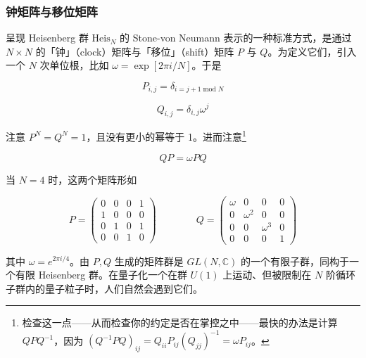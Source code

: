 \subsubsection*{钟矩阵与移位矩阵} %

呈现 Heisenberg 群 $\mathrm{Heis}_N$ 的 Stone-von Neumann 表示的一种标准方式，是通过 $N\times N$ 的「钟」（clock）矩阵与「移位」（shift）矩阵 $P$ 与 $Q$。为定义它们，引入一个 $N$ 次单位根，比如 $\omega=\exp[2\pi i/N]$。于是

\begin{equation}
  P_{i,j}=\delta_{i=j+1\operatorname{mod}N}
  \tag{2.207}
  \label{eq:2.207}
\end{equation}

\begin{equation}
  Q_{i,j}=\delta_{i,j}\omega^{j}
  \tag{2.208}
  \label{eq:2.208}
\end{equation}

注意 $P^N=Q^N=1$，且没有更小的幂等于 1。进而注意\footnote{检查这一点——从而检查你的约定是否在掌控之中——最快的办法是计算 $QPQ^{-1}$，因为 $(Q^{-1}PQ)_{ij}=Q_{ii}P_{ij}(Q_{jj})^{-1}=\omega P_{ij}$。}

\begin{equation}
  QP=\omega PQ
  \tag{2.209}
  \label{eq:2.209}
\end{equation}

当 $N=4$ 时，这两个矩阵形如

\begin{equation}
  P=
  \begin{pmatrix}
    0&0&0&1\\
    1&0&0&0\\
    0&1&0&1\\
    0&0&1&0
  \end{pmatrix}
  \qquad\qquad
  Q=
  \begin{pmatrix}
    \omega&0&0&0\\
    0&\omega^2&0&0\\
    0&0&\omega^3&0\\
    0&0&0&1
  \end{pmatrix}
  \tag{2.210}
  \label{eq:2.210}
\end{equation}

其中 $\omega=e^{2\pi i/4}$。由 $P,Q$ 生成的矩阵群是 $GL(N,\mathbb{C})$ 的一个有限子群，同构于一个有限 Heisenberg 群。在量子化一个在群 $U(1)$ 上运动、但被限制在 $N$ 阶循环子群内的量子粒子时，人们自然会遇到它们。

